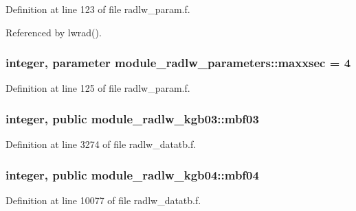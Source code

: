 Definition at line 123 of file radlw\+\_\+param.\+f.



Referenced by lwrad().

\subsubsection[{\texorpdfstring{maxxsec}{maxxsec}}]{\setlength{\rightskip}{0pt plus 5cm}integer, parameter module\+\_\+radlw\+\_\+parameters\+::maxxsec = 4}\hypertarget{group__module__radlw__main_ga5817221936731c6ee6443da6a64e934e}{}\label{group__module__radlw__main_ga5817221936731c6ee6443da6a64e934e}


Definition at line 125 of file radlw\+\_\+param.\+f.

\subsubsection[{\texorpdfstring{mbf03}{mbf03}}]{\setlength{\rightskip}{0pt plus 5cm}integer, public module\+\_\+radlw\+\_\+kgb03\+::mbf03}\hypertarget{group__module__radlw__main_ga655fff8711d78d62ae9d4fa27d02621a}{}\label{group__module__radlw__main_ga655fff8711d78d62ae9d4fa27d02621a}


Definition at line 3274 of file radlw\+\_\+datatb.\+f.

\subsubsection[{\texorpdfstring{mbf04}{mbf04}}]{\setlength{\rightskip}{0pt plus 5cm}integer, public module\+\_\+radlw\+\_\+kgb04\+::mbf04}\hypertarget{group__module__radlw__main_ga768f4447809fb11206dce383a121d595}{}\label{group__module__radlw__main_ga768f4447809fb11206dce383a121d595}


Definition at line 10077 of file radlw\+\_\+datatb.\+f.

